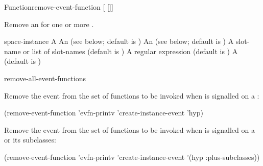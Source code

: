 \documentclass[10pt,twoside,english,pdftex]{article}
\begin{document}

\begin{functiondoc}{Function}{remove-event-function}%
{ [ 
[]] \\
 }
%


\fnsyntax

\fnpurpose Remove an  for one or more .

\fnpackage {}

\fnmodule {}

\fnargs
\begin{args}{space-instance}
\arg[function] A 
 An  
(see below; default is )
 An 
(see below; default is )
 A slot-name or list of slot-names
(default is )
 A  regular expression
(default is \code{(*)})
\arg[permanent] A  (default is \nil)
\end{args}

\fndsyntax
\eventclassspec
\subeventingspec
\syntaxsep
\unitclassinstancespec
\subclassingspec

\begin{alsos}{remove-all-event-functions}
\end{alsos}

\fnexamples
{}%
Remove the event   from the set of functions
to be invoked when  is signalled on a
 :
\begin{example}
  (remove-event-function 'evfn-printv 'create-instance-event 'hyp)
\end{example}

Remove the event   from the set of functions
to be invoked when  is signalled on a
  or its subclasses:
\begin{example}
  (remove-event-function 'evfn-printv 'create-instance-event '(hyp :plus-subclasses))
\end{example}

\fnnote
\instanceevfnsnyi

\end{functiondoc}
\end{document}
